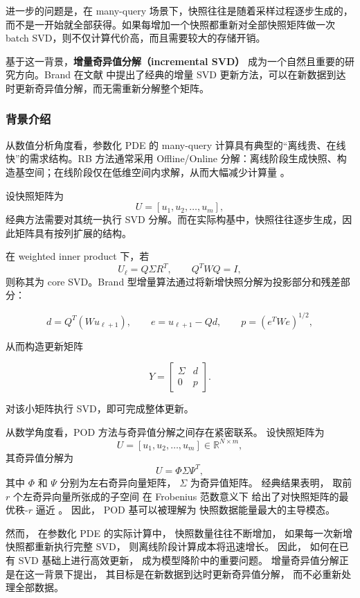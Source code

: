 进一步的问题是，在 many-query 场景下，快照往往是随着采样过程逐步生成的，而不是一开始就全部获得。如果每增加一个快照都重新对全部快照矩阵做一次 batch SVD，则不仅计算代价高，而且需要较大的存储开销。

基于这一背景，\textbf{增量奇异值分解（incremental SVD）} 成为一个自然且重要的研究方向。Brand 在文献 \cite{brand2002,brand2006} 中提出了经典的增量 SVD 更新方法，可以在新数据到达时更新奇异值分解，而无需重新分解整个矩阵。

\subsubsection{背景介绍}

从数值分析角度看，参数化 PDE 的 many-query 计算具有典型的“离线贵、在线快”的需求结构。RB 方法通常采用 Offline/Online 分解：离线阶段生成快照、构造基空间；在线阶段仅在低维空间内求解，从而大幅减少计算量 \cite{hesthaven2015}。

设快照矩阵为
\[
U=[u_1,u_2,\dots,u_m],
\]
经典方法需要对其统一执行 SVD 分解。而在实际构基中，快照往往逐步生成，因此矩阵具有按列扩展的结构。

在 weighted inner product 下，若
\[
U_\ell = Q\Sigma R^T,\qquad Q^TWQ=I,
\]
则称其为 core SVD。Brand 型增量算法通过将新增快照分解为投影部分和残差部分：

\[
d=Q^T(Wu_{\ell+1}),\qquad
e=u_{\ell+1}-Qd,
\qquad
p=(e^TWe)^{1/2},
\]

从而构造更新矩阵

\[
Y=
\begin{bmatrix}
\Sigma & d\\
0 & p
\end{bmatrix}.
\]

对该小矩阵执行 SVD，即可完成整体更新。

从数学角度看，POD 方法与奇异值分解之间存在紧密联系。
设快照矩阵为
\[
U=[u_1,u_2,\dots,u_m]\in\mathbb R^{N\times m},
\]
其奇异值分解为
\[
U=\Phi\Sigma\Psi^T,
\]
其中 $\Phi$ 和 $\Psi$ 分别为左右奇异向量矩阵，
$\Sigma$ 为奇异值矩阵。
经典结果表明，
取前 $r$ 个左奇异向量所张成的子空间
在 Frobenius 范数意义下
给出了对快照矩阵的最优秩-$r$ 逼近
\cite{trefethen1997}。
因此，
POD 基可以被理解为
快照数据能量最大的主导模态。

然而，
在参数化 PDE 的实际计算中，
快照数量往往不断增加，
如果每一次新增快照都重新执行完整 SVD，
则离线阶段计算成本将迅速增长。
因此，
如何在已有 SVD 基础上进行高效更新，
成为模型降阶中的重要问题。
增量奇异值分解正是在这一背景下提出，
其目标是在新数据到达时更新奇异值分解，
而不必重新处理全部数据。


